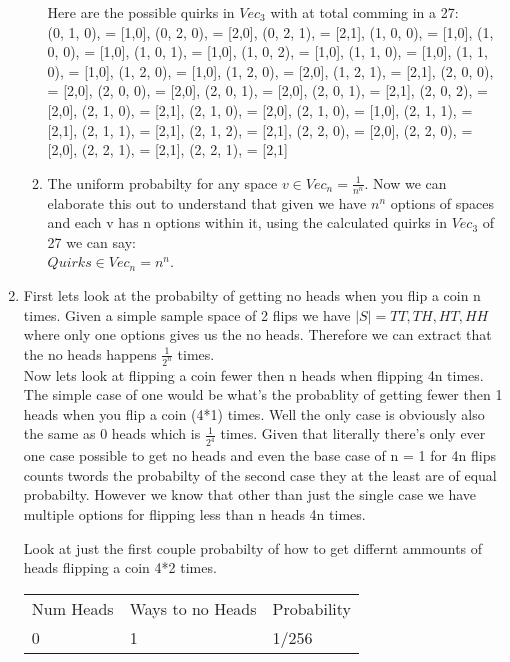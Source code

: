 \documentclass{article}
\begin{document}
\begin{enumerate}
\begin{enumerate}
        Here are the possible quirks in $Vec_3$ with at total comming in a 27: \\
        (0, 1, 0), = [1,0], (0, 2, 0), = [2,0], (0, 2, 1), = [2,1], (1, 0, 0), = [1,0],
        (1, 0, 0), = [1,0], (1, 0, 1), = [1,0], (1, 0, 2), = [1,0], (1, 1, 0), = [1,0],
        (1, 1, 0), = [1,0], (1, 2, 0), = [1,0], (1, 2, 0), = [2,0], (1, 2, 1), = [2,1],
        (2, 0, 0), = [2,0], (2, 0, 0), = [2,0], (2, 0, 1), = [2,0], (2, 0, 1), = [2,1],
        (2, 0, 2), = [2,0], (2, 1, 0), = [2,1], (2, 1, 0), = [2,0], (2, 1, 0), = [1,0], 
        (2, 1, 1), = [2,1], (2, 1, 1), = [2,1], (2, 1, 2), = [2,1], (2, 2, 0), = [2,0],
        (2, 2, 0), = [2,0], (2, 2, 1), = [2,1], (2, 2, 1), = [2,1]

        \item The uniform probabilty for any space $v \in Vec_n = \frac{1}{n^n}$.
        Now we can elaborate this out to understand that given we have $n^n$ options of spaces and each v has n options within it, using the calculated quirks in $Vec_3$ of 27 we can say:\\
        $Quirks \in Vec_n = n^n$.        
      \end{enumerate}

      \item First lets look at the probabilty of getting no heads when you flip a coin n times. 
      Given a simple sample space of 2 flips we have $|S| = {TT, TH, HT, HH}$ where only one options gives us the no heads. 
      Therefore we can extract that the no heads happens $\frac{1}{2^n}$ times. \\
      Now lets look at flipping a coin fewer then n heads when flipping 4n times. 
      The simple case of one would be what's the probablity of getting fewer then 1 heads when you flip a coin (4*1) times.
      Well the only case is obviously also the same as 0 heads which is $\frac{1}{2^4}$ times. 
      Given that literally there's only ever one case possible to get no heads and even the base case of n = 1 for 4n flips counts twords the probabilty of the second case they at the least are of equal probabilty.
      However we know that other than just the single case we have multiple options for flipping less than n heads 4n times.

      Look at just the first couple probabilty of how to get differnt ammounts of heads flipping a coin 4*2 times. \\

      \begin{tabular}{lll}
        Num Heads & Ways to no Heads & Probability \\
        0         & 1                 & 1/256       \\
        \end{tabular} \\


\end{enumerate}
\end{document}
